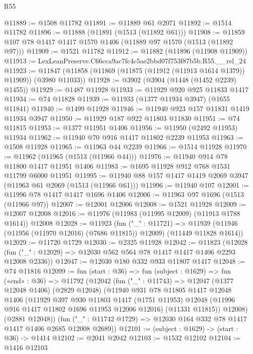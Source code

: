 \begin{lexlean}{R55}
\begin{coremodule}
{{@11889 := @1508 @11782
@11891 := @11889 @61 @2071
@11892 := @1514 @11782
@11896 := @11888 (@11891 (@1513 (@11892 @61)))
@11908 := @11859 @107 @78 @1417 @1417 @1570 @1406 (@11889 @97 @1570 (@1513 (@11892 @97)))
@11909 := @1521 @11782
@11912 := @11882 (@11896 (@11908 @11909))
@11913 := LexLeanPreserve.C66cca9ac7fc4c5ae2bbd07f753f87b5b.R55.__rel_24
@11923 := @11847 (@11858 (@11869 (@11875 (@11912 (@11913 @1614 @1379)) @11909)) (@3980 @11033))
@11928 := @3902 (@3904 (@1448 (@1452 @2239) @1455))
@11929 := @1487 @11928
@11933 := @11929 @920 @925 @11833 @1417
@11934 := @74 @11828
@11939 := @11933 (@1377 @11934 @3947) (@1655 @11841)
@11940 := @1499 @11928
@11946 := @11940 @923 @157 @11831 @1419 @11934 @3947
@11950 := @11929 @187 @922 @11803 @11830
@11951 := @74 @11815
@11953 := @1377 @11951 @1406
@11956 := @11950 (@2492 @11953) @11934
@11962 := @11940 @70 @916 @1417 @11802 @2239 @11953
@11963 := @1508 @11928
@11965 := @11963 @44 @2239
@11966 := @1514 @11928
@11970 := @11962 (@11965 (@1513 (@11966 @44)))
@11976 := @11940 @914 @78 @11800 @1417 @11951 @1406
@11983 := @1695 @11928 @912 @768 @1531 @11799 @6000 @11951
@11995 := @11940 @88 @157 @1417 @1419 @2069 @3947 (@11963 @61 @2069 (@1513 (@11966 @61)))
@11996 := @11940 @107
@12001 := @11996 @78 @1417 @1417 @1696 @1406
@12006 := @11963 @97 @1696 (@1513 (@11966 @97))
@12007 := @12001 @12006
@12008 := @1521 @11928
@12009 := @12007 @12008
@12016 := @11976 (@11983 (@11995 @12009) (@11913 @1788 @1614)) @12008
@12028 := @11923
    (fun ("_" : @11721) =>
    @11939 (@11946 (@11956 (@11970 @12016) (@7686 @11815)) @12009) (@11449 @11828 @1614))
@12029 := @11720 @1729
@12030 := @2325 @11928
@12042 := @11823
    (@12028 (fun ("_" : @12029) => @12030 @562 @564 @78 @1417 @1417 @1406 @2293 @12008 @2336))
@12047 := @12030 @180 @332 @933 @11807 @1417
@12048 := @74 @11816
@12099 := fun (start : @36) =>
  fun (subject : @1629) =>
  fun («end» : @36) =>
  @11792
    (@12042
      (fun ("_" : @11743) =>
      @12047
        (@1377 @12048 @1406)
        (@2829 @12048)
        (@11940
          @931
          @78
          @11805
          @1417
          @12048
          @1406
          (@11929
            @397
            @930
            @11803
            @1417
            (@1751 @11953)
            @12048
            (@11996 @916 @1417 @11802 @1696 @11953 @12006 @12016)
            (@11331 @11815))
          @12008)
        (@2881 @12048))
      (fun ("_" : @11742 @1729) => @12030 @164 @332 @78 @1417 @1417 @1406 @2685 @12008 @2689))
@12101 := (subject : @1629) -> (start : @36) -> @1414
@12102 := @2041 @2042
@12103 := @1532 @12102
@12104 := @1416 @12103
}}
\end{coremodule}
\end{lexlean}
